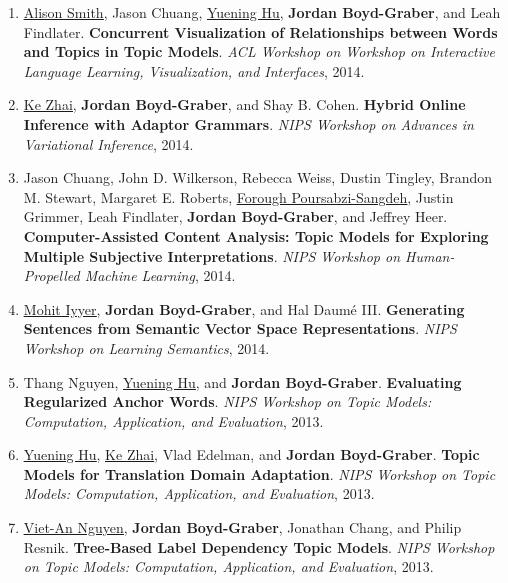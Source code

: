 {\begin{enumerate}
	 \item \underline{\href{http://alisonmsmith.github.io/}{Alison Smith}}, Jason Chuang, \underline{\href{https://scholar.google.com/citations?user=mO_62fQAAAAJ&hl=en}{Yuening Hu}}, {\bf Jordan Boyd-Graber}, and Leah Findlater.  {\bf Concurrent Visualization of Relationships between Words and Topics in Topic Models}.  \emph{ACL Workshop on Workshop on Interactive Language Learning, Visualization, and Interfaces}, 2014.

	 \item \underline{\href{https://kzhai.github.io/}{Ke Zhai}}, {\bf Jordan Boyd-Graber}, and Shay B. Cohen.  {\bf Hybrid Online Inference with Adaptor Grammars}.  \emph{NIPS Workshop on Advances in Variational Inference}, 2014.

	 \item Jason Chuang, John D. Wilkerson, Rebecca Weiss, Dustin Tingley, Brandon M. Stewart, Margaret E. Roberts, \underline{\href{https://www.microsoft.com/en-us/research/people/fpoursabzi/projects/}{Forough Poursabzi-Sangdeh}}, Justin Grimmer, Leah Findlater, {\bf Jordan Boyd-Graber}, and Jeffrey Heer.  {\bf Computer-Assisted Content Analysis: Topic Models for Exploring Multiple Subjective Interpretations}.  \emph{NIPS Workshop on Human-Propelled Machine Learning}, 2014.

	 \item \underline{\href{https://people.cs.umass.edu/~miyyer/}{Mohit Iyyer}}, {\bf Jordan Boyd-Graber}, and Hal {Daum\'{e} III}.  {\bf Generating Sentences from Semantic Vector Space Representations}.  \emph{NIPS Workshop on Learning Semantics}, 2014.

	 \item Thang Nguyen, \underline{\href{https://scholar.google.com/citations?user=mO_62fQAAAAJ&hl=en}{Yuening Hu}}, and {\bf Jordan Boyd-Graber}.  {\bf Evaluating Regularized Anchor Words}.  \emph{NIPS Workshop on Topic Models: Computation, Application, and Evaluation}, 2013.

	 \item \underline{\href{https://scholar.google.com/citations?user=mO_62fQAAAAJ&hl=en}{Yuening Hu}}, \underline{\href{https://kzhai.github.io/}{Ke Zhai}}, Vlad Edelman, and {\bf Jordan Boyd-Graber}.  {\bf Topic Models for Translation Domain Adaptation}.  \emph{NIPS Workshop on Topic Models: Computation, Application, and Evaluation}, 2013.

	 \item \underline{\href{https://viet-an.github.io/}{Viet-An Nguyen}}, {\bf Jordan Boyd-Graber}, Jonathan Chang, and Philip Resnik.  {\bf Tree-Based Label Dependency Topic Models}.  \emph{NIPS Workshop on Topic Models: Computation, Application, and Evaluation}, 2013.


\end{enumerate}}
